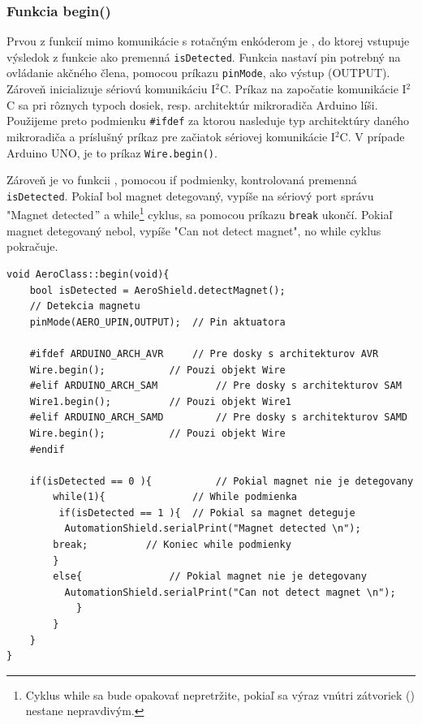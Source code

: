 \subsubsection{Funkcia begin()}

Prvou z funkcií mimo komunikácie s rotačným enkóderom je , do ktorej vstupuje výsledok z funkcie  ako premenná \verb|isDetected|. Funkcia  nastaví pin potrebný na ovládanie akčného člena, pomocou príkazu \verb|pinMode|, ako výstup (OUTPUT). Zároveň inicializuje sériovú komunikáciu I$^{2}$C. Príkaz na započatie komunikácie I$^{2}$C sa pri rôznych typoch dosiek, resp. architektúr mikroradiča Arduino líši. Použijeme preto podmienku \verb|#ifdef| za ktorou nasleduje typ architektúry daného mikroradiča a príslušný príkaz pre začiatok sériovej komunikácie I$^{2}$C. V prípade Arduino UNO, je to príkaz \verb|Wire.begin()|. 

Zároveň je vo funkcii , pomocou if podmienky, kontrolovaná premenná \verb|isDetected|. Pokiaľ bol magnet detegovaný, vypíše na sériový port správu "Magnet detected$"$ a while\footnote[7]{Cyklus while sa bude opakovať nepretržite, pokiaľ sa výraz vnútri zátvoriek () nestane nepravdivým.} cyklus, sa pomocou príkazu \verb|break| ukončí. Pokiaľ magnet detegovaný nebol, vypíše "Can not detect magnet", no while cyklus pokračuje.  


\begin{lstlisting}[caption={Zdrojový kód funkcie begin.},captionpos=b]
void AeroClass::begin(void){                       
	bool isDetected = AeroShield.detectMagnet(); 
	// Detekcia magnetu 
	pinMode(AERO_UPIN,OUTPUT);	// Pin aktuatora
	
	#ifdef ARDUINO_ARCH_AVR		// Pre dosky s architekturov AVR
	Wire.begin();			// Pouzi objekt Wire
	#elif ARDUINO_ARCH_SAM      	// Pre dosky s architekturov SAM
	Wire1.begin();			// Pouzi objekt Wire1
	#elif ARDUINO_ARCH_SAMD     	// Pre dosky s architekturov SAMD
	Wire.begin();			// Pouzi objekt Wire
	#endif
	
	if(isDetected == 0 ){       	// Pokial magnet nie je detegovany
		while(1){               // While podmienka
		 if(isDetected == 1 ){	// Pokial sa magnet deteguje
		  AutomationShield.serialPrint("Magnet detected \n");	
		break;		    // Koniec while podmienky
		}
		else{               // Pokial magnet nie je detegovany
		  AutomationShield.serialPrint("Can not detect magnet \n");
			}
		}
	}       
} 
\end{lstlisting}


